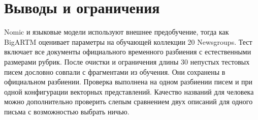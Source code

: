 \documentclass[11pt,a4paper]{article}
\begin{document}
\clearpage\section{Выводы и ограничения}

Nomic и языковые модели используют внешнее предобучение, тогда как BigARTM оценивает параметры на обучающей коллекции 20 Newsgroups. Тест включает все документы официального временного разбиения с естественными размерами рубрик. После очистки и ограничения длины 30 непустых тестовых писем дословно совпали с фрагментами из обучения. Они сохранены в официальном разбиении. Проверка выполнена на одном разбиении писем и при одной конфигурации векторных представлений. Качество названий для человека можно дополнительно проверить слепым сравнением двух описаний для одного письма с возможностью выбрать ничью.
\end{document}
